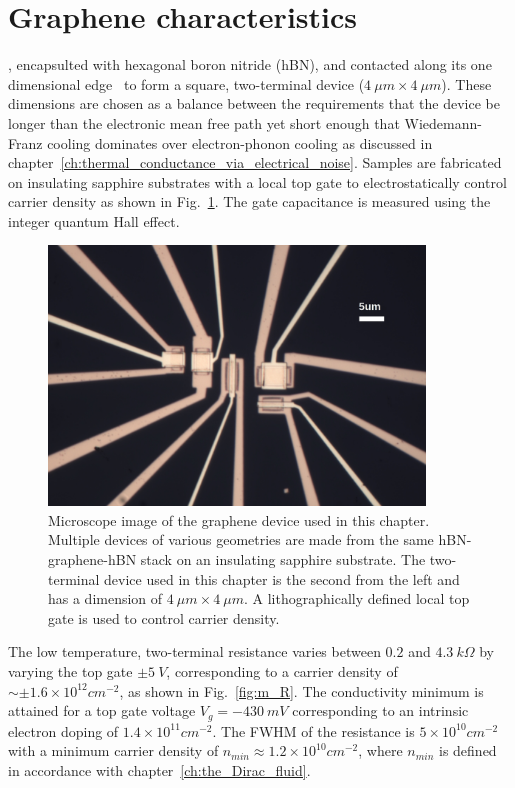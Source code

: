 \section{Graphene characteristics}
\label{section:Giorgio}
, encapsulted with hexagonal boron nitride (hBN), and contacted along its one dimensional edge~\cite{wang_one-dimensional_2013} to form a square, two-terminal device ($4~\mu m\times4~\mu m$). These dimensions are chosen as a balance between the requirements that the device be longer than the electronic mean free path yet short enough that Wiedemann-Franz cooling dominates over electron-phonon cooling as discussed in chapter~\ref{ch:thermal_conductance_via_electrical_noise}. Samples are fabricated on insulating sapphire substrates with a local top gate to electrostatically control carrier density as shown in Fig.~\ref{fig:m_Giorgio}. The gate capacitance is measured using the integer quantum Hall effect.
\begin{figure}
\centering
\includegraphics[width=100mm]{figures/magneto/100x_crop.jpg}
\caption{Microscope image of the graphene device used in this chapter. Multiple devices of various geometries are made from the same hBN-graphene-hBN stack on an insulating sapphire substrate. The two-terminal device used in this chapter is the second from the left and has a dimension of $4~\mu m\times4~\mu m$. A lithographically defined local top gate is used to control carrier density.}
\label{fig:m_Giorgio}
\end{figure}
The low temperature, two-terminal resistance varies between $0.2$ and $4.3~k\Omega$ by varying the top gate $\pm5~V$, corresponding to a carrier density of $\sim\pm1.6\times 10^{12}cm^{-2}$, as shown in Fig.~\ref{fig:m_R}. The conductivity minimum is attained for a top gate voltage $V_g = -430~mV$ corresponding to an intrinsic electron doping of $1.4\times 10^{11}cm^{-2}$. The FWHM of the resistance is $5\times 10^{10}cm^{-2}$ with a minimum carrier density of $n_{min}\approx 1.2\times 10^{10}cm^{-2}$, where $n_{min}$ is defined in accordance with chapter~\ref{ch:the_Dirac_fluid}.
